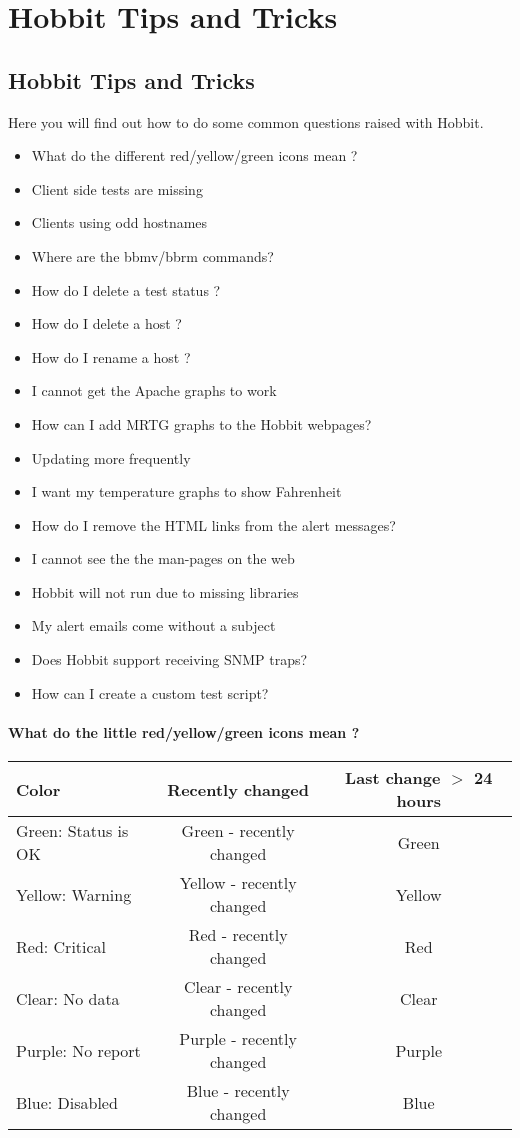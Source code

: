 \chapter{Hobbit Tips and Tricks}
\label{chap:Hobbit Tips and Tricks}


\section*{Hobbit Tips and Tricks}


 Here you will find out how to do some common questions raised with Hobbit.
\begin{itemize}
\item What do the different red/yellow/green icons mean ?
\item Client side tests are missing
\item Clients using odd hostnames
\item Where are the bbmv/bbrm commands?
\item How do I delete a test status ?
\item How do I delete a host ?
\item How do I rename a host ?
\item I cannot get the Apache graphs to work
\item How can I add MRTG graphs to the Hobbit webpages?
\item Updating more frequently
\item I want my temperature graphs to show Fahrenheit
\item How do I remove the HTML links from the alert messages?
\item I cannot see the the man-pages on the web
\item Hobbit will not run due to missing libraries
\item My alert emails come without a subject
\item Does Hobbit support receiving SNMP traps?
\item How can I create a custom test script?

\end{itemize}
\hline 
\subsubsection*{What do the little red/yellow/green icons mean ?}


\begin{tabular}{|l|c|c|}
\hline 
Color &Recently changed &Last change $>$ 24 hours \\
 \hline 
Green: Status is OK &Green - recently changed &Green \\
 \hline 
Yellow: Warning &Yellow - recently changed &Yellow \\
 \hline 
Red: Critical &Red - recently changed &Red \\
 \hline 
Clear: No data &Clear - recently changed &Clear \\
 \hline 
Purple: No report &Purple - recently changed &Purple \\
 \hline 
Blue: Disabled &Blue - recently changed &Blue \\
 \hline 

\end{tabular}

